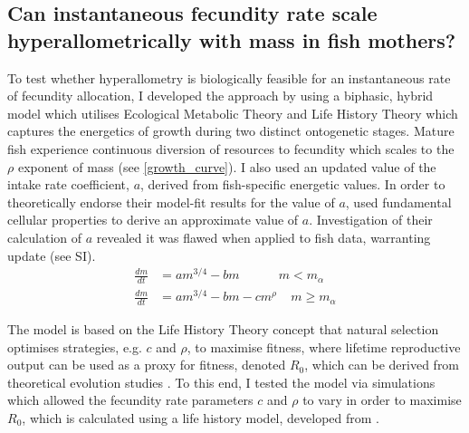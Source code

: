 \documentclass[a4paper]{article} %
\begin{document}
\subsection{Can instantaneous fecundity rate scale hyperallometrically with mass in fish mothers?}

To test whether hyperallometry is biologically feasible for an instantaneous rate of fecundity allocation, I developed the \textcite{Charnov2001} approach by using a biphasic, hybrid model which utilises Ecological Metabolic Theory and Life History Theory which captures the energetics of growth during two distinct ontogenetic stages. Mature fish experience continuous diversion of resources to fecundity which scales to the $\rho$ exponent of mass (see \cref{growth_curve}). I also used an updated value of the intake rate coefficient, $a$, derived from fish-specific energetic values. In order to theoretically endorse their model-fit results for the value of $a$, \textcite{West2001} used fundamental cellular properties to derive an approximate value of $a$. Investigation of their calculation of $a$ revealed it was flawed when applied to fish data, warranting update (see SI).
\begin{align}
    \frac{dm}{dt} &= am^{3/4} - bm \ \ \ \ \ \ \ \ \ \ \ \ \ \ m < m_{\alpha} \label{luke_model_juvenile}\\
    \frac{dm}{dt} &= am^{3/4} - bm - cm^{\rho} \ \ \ \ \ m \geq m_{\alpha} \label{luke_model}
\end{align}

The model is based on the Life History Theory concept that natural selection optimises strategies, e.g. $c$ and $\rho$, to maximise fitness, where lifetime reproductive output can be used as a proxy for fitness, denoted $R_0$, which can be derived from theoretical evolution studies \autocite{Charnov2001, stearns1992evolution}. To this end, I tested the model via simulations which allowed the fecundity rate parameters $c$ and $\rho$ to vary in order to maximise $R_0$, which is calculated using a life history model, developed from \textcite{Charnov2001}.
\end{document}
